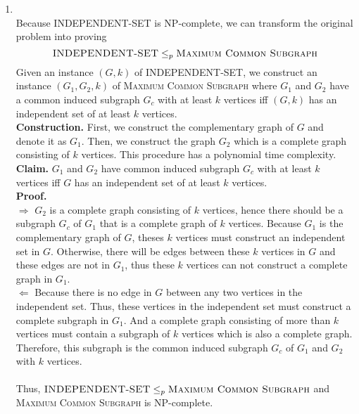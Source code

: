 \documentclass[12pt,a4paper]{article}
\makeatletter
\newtheorem*{solution}{Solution}
\theoremstyle{definition}
\renewenvironment{solution}[1][Solution] {\par\pushQED{\qed}\normalfont\topsep6\p@\@plus6\p@\relax\trivlist\item[\hskip\labelsep\bfseries#1\@addpunct{.}]\ignorespaces}{\popQED\endtrivlist\@endpefalse} \makeatother
\makeatother
\begin{document}
\begin{enumerate}
    \begin{solution}
    ~\\
    Because \textsc{INDEPENDENT-SET} is NP-complete, we can transform the original problem into proving
    $$
    \textsc{INDEPENDENT-SET}\le_p\textsc{Maximum Common Subgraph}
    $$
    Given an instance $(G,k)$ of \textsc{INDEPENDENT-SET}, we construct an instance $(G_1,G_2,k)$ of \textsc{Maximum Common Subgraph} where $G_1$ and $G_2$ have a common induced subgraph $G_c$ with at least $k$ vertices iff $(G,k)$ has an independent set of at least $k$ vertices.\\
    \textbf{Construction.} First, we construct the complementary graph of $G$ and denote it as $G_1$. Then, we construct the graph $G_2$ which is a complete graph consisting of $k$ vertices. This procedure has a polynomial time complexity.\\
    \textbf{Claim.} $G_1$ and $G_2$  have common induced subgraph $G_c$ with at least $k$ vertices iff $G$ has an independent set of at least $k$ vertices.\\
    \textbf{Proof.} \\
    $\Longrightarrow$ $G_2$ is a complete graph consisting of $k$ vertices, hence there should be a subgraph $G_c$ of $G_1$ that is a complete graph of $k$ vertices. Because $G_1$ is the complementary graph of $G$, theses $k$ vertices must construct an independent set in $G$. Otherwise, there will be edges between these $k$ vertices in $G$ and these edges are not in $G_1$, thus these $k$ vertices can not construct a complete graph in $G_1$.\\
    $\Longleftarrow$ Because there is no edge in $G$ between any two vertices in the independent set. Thus, these vertices in the independent set must construct a complete subgraph in $G_1$. And a complete graph consisting of more than $k$ vertices must contain a subgraph of $k$ vertices which is also a complete graph. Therefore, this subgraph is the common induced subgraph $G_c$ of $G_1$ and $G_2$ with $k$ vertices.\\
    ~\\
    Thus, $\textsc{INDEPENDENT-SET}\le_p\textsc{Maximum Common Subgraph}$ and \textsc{Maximum Common Subgraph} is NP-complete.
    \end{solution}


\end{enumerate}
\end{document}
